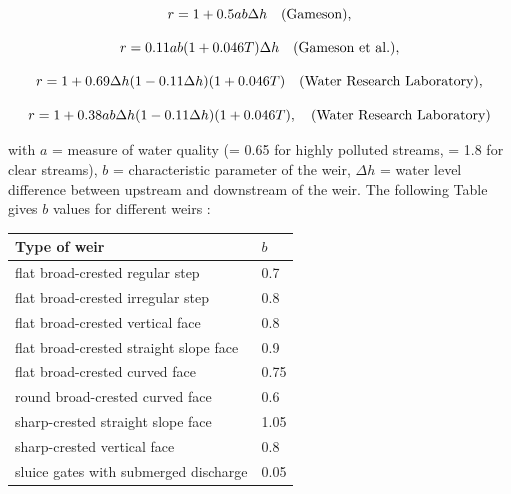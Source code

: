 \begin{equation}
  r = 1 + 0.5 a b \Delta h \quad \rm{(Gameson)},
\end{equation}

\begin{equation}
  r = 0.11 a b (1+0.046 T) \Delta h \quad \rm{(Gameson~et~al.)},
\end{equation}

\begin{equation}
  r = 1 + 0.69 \Delta h (1 - 0.11 \Delta h) (1 +0.046 T) \quad \rm{(Water~Research~Laboratory)},
\end{equation}

\begin{equation}
  r = 1 + 0.38 a b  \Delta h (1 - 0.11 \Delta h) (1 +0.046 T),
  \quad \rm{(Water~Research~Laboratory)}
\end{equation}

with $a$ = measure of water quality (= 0.65 for highly polluted streams,
= 1.8 for clear streams),
$b$ = characteristic parameter of the weir,
$\Delta h$ = water level difference between upstream and downstream of the weir.
The following Table gives $b$ values for different weirs \cite{mccutcheon_wq_1989}:\\

\begin{table}[H]
 			\centering
\begin{tabular}{p{3.0in}p{3.0in}}
\hline
\multicolumn{1}{|p{3.0in}}{Type of weir} & 
\multicolumn{1}{|p{3.0in}|}{$b$} \\
\hline
\multicolumn{1}{|p{3.0in}}{flat broad-crested regular step} & 
\multicolumn{1}{|p{3.0in}|}{0.7} \\
\hline
\multicolumn{1}{|p{3.0in}}{flat broad-crested irregular step} & 
\multicolumn{1}{|p{3.0in}|}{0.8} \\
\hline
\multicolumn{1}{|p{3.0in}}{flat broad-crested vertical face} & 
\multicolumn{1}{|p{3.0in}|}{0.8} \\
\hline
\multicolumn{1}{|p{3.0in}}{flat broad-crested straight slope face} & 
\multicolumn{1}{|p{3.0in}|}{0.9} \\
\hline
\multicolumn{1}{|p{3.0in}}{flat broad-crested curved face} & 
\multicolumn{1}{|p{3.0in}|}{0.75} \\
\hline
\multicolumn{1}{|p{3.0in}}{round broad-crested curved face} & 
\multicolumn{1}{|p{3.0in}|}{0.6} \\
\hline
\multicolumn{1}{|p{3.0in}}{sharp-crested straight slope face} & 
\multicolumn{1}{|p{3.0in}|}{1.05} \\
\hline
\multicolumn{1}{|p{3.0in}}{sharp-crested vertical face} & 
\multicolumn{1}{|p{3.0in}|}{0.8} \\
\hline
\multicolumn{1}{|p{3.0in}}{sluice gates with submerged discharge} & 
\multicolumn{1}{|p{3.0in}|}{0.05} \\
\hline

\end{tabular}
\end{table}

